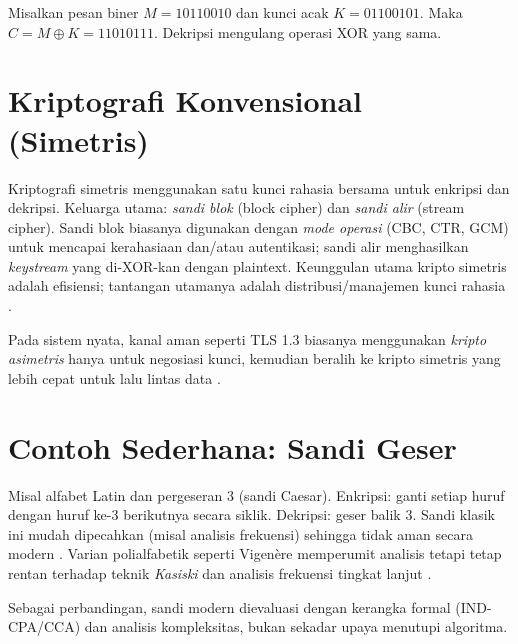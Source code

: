 \documentclass[../main.tex]{subfiles}
\begin{document}
\begin{example}
Misalkan pesan biner \(M=10110010\) dan kunci acak \(K=01100101\). Maka \(C=M\oplus K=11010111\). Dekripsi mengulang operasi XOR yang sama.
\end{example}

\section{Kriptografi Konvensional (Simetris)}
Kriptografi simetris menggunakan satu kunci rahasia bersama untuk enkripsi dan dekripsi. Keluarga utama: \emph{sandi blok} (block cipher) dan \emph{sandi alir} (stream cipher). Sandi blok biasanya digunakan dengan \emph{mode operasi} (CBC, CTR, GCM) untuk mencapai kerahasiaan dan/atau autentikasi; sandi alir menghasilkan \emph{keystream} yang di-XOR-kan dengan plaintext. Keunggulan utama kripto simetris adalah efisiensi; tantangan utamanya adalah distribusi/manajemen kunci rahasia \citep{stallings,menezes}.

Pada sistem nyata, kanal aman seperti TLS 1.3 biasanya menggunakan \emph{kripto asimetris} hanya untuk negosiasi kunci, kemudian beralih ke kripto simetris yang lebih cepat untuk lalu lintas data \citep{rfc8446}.

\section{Contoh Sederhana: Sandi Geser}
Misal alfabet Latin dan pergeseran 3 (sandi Caesar). Enkripsi: ganti setiap huruf dengan huruf ke-3 berikutnya secara siklik. Dekripsi: geser balik 3. Sandi klasik ini mudah dipecahkan (misal analisis frekuensi) sehingga tidak aman secara modern \citep{wikipedia_caesar}. Varian polialfabetik seperti Vigen\`{e}re memperumit analisis tetapi tetap rentan terhadap teknik \emph{Kasiski} dan analisis frekuensi tingkat lanjut \citep{wikipedia_vigenere}.

Sebagai perbandingan, sandi modern dievaluasi dengan kerangka formal (IND-CPA/CCA) dan analisis kompleksitas, bukan sekadar upaya menutupi algoritma.
\end{document}
